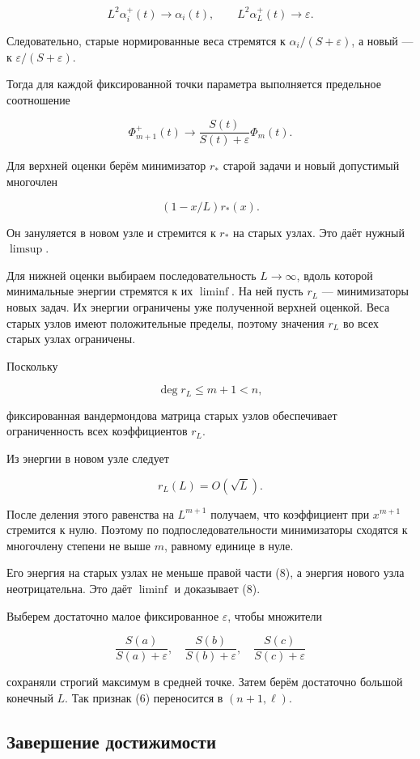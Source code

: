 \documentclass[11pt,a4paper]{article}
\begin{document}
\[
L^2\alpha_i^+(t)\longrightarrow\alpha_i(t),
\qquad
L^2\alpha_L^+(t)\longrightarrow\varepsilon.
\]

Следовательно, старые нормированные веса стремятся к \(\alpha_i/(S+\varepsilon)\), а новый — к \(\varepsilon/(S+\varepsilon)\).

Тогда для каждой фиксированной точки параметра выполняется предельное соотношение

\[
\boxed{
\Phi_{m+1}^+(t)
\longrightarrow
\frac{S(t)}{S(t)+\varepsilon}\Phi_m(t).
}
\tag{8}
\]



Для верхней оценки берём минимизатор \(r_*\) старой задачи и новый допустимый многочлен

\[
(1-x/L)r_*(x).
\]

Он зануляется в новом узле и стремится к \(r_*\) на старых узлах. Это даёт нужный \(\limsup\).

Для нижней оценки выбираем последовательность \(L\to\infty\), вдоль которой минимальные энергии стремятся к их \(\liminf\). На ней пусть \(r_L\) — минимизаторы новых задач. Их энергии ограничены уже полученной верхней оценкой. Веса старых узлов имеют положительные пределы, поэтому значения \(r_L\) во всех старых узлах ограничены.

Поскольку

\[
\deg r_L\le m+1<n,
\]

фиксированная вандермондова матрица старых узлов обеспечивает ограниченность всех коэффициентов \(r_L\).

Из энергии в новом узле следует

\[
r_L(L)=O(\sqrt L).
\]

После деления этого равенства на \(L^{m+1}\) получаем, что коэффициент при \(x^{m+1}\) стремится к нулю. Поэтому по подпоследовательности минимизаторы сходятся к многочлену степени не выше \(m\), равному единице в нуле.

Его энергия на старых узлах не меньше правой части (8), а энергия нового узла неотрицательна. Это даёт \(\liminf\) и доказывает (8).

Выберем достаточно малое фиксированное \(\varepsilon\), чтобы множители

\[
\frac{S(a)}{S(a)+\varepsilon},\quad
\frac{S(b)}{S(b)+\varepsilon},\quad
\frac{S(c)}{S(c)+\varepsilon}
\]

сохраняли строгий максимум в средней точке. Затем берём достаточно большой конечный \(L\). Так признак (6) переносится в \((n+1,\ell)\).

\subsection*{Завершение достижимости}
\end{document}
